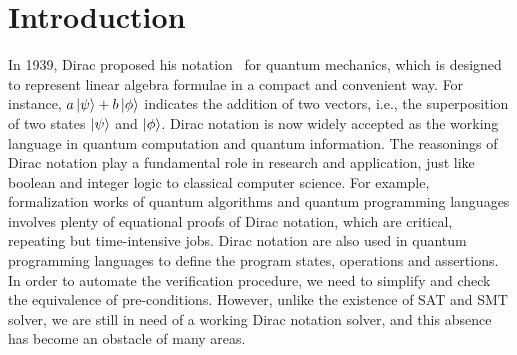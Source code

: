 \documentclass[runningheads]{llncs}
\begin{document}
\newcommand{\reduce}{\triangleright}

\newcommand{\Sort}{\mathsf{Sort}}
\newcommand{\WF}{\mathcal{WF}}

\newcommand{\Index}{\mathsf{Index}}
\newcommand{\Type}{\mathsf{Type}}
\newcommand{\Basis}{\mathsf{Basis}}

\newcommand{\SType}{\mathcal{S}}
\newcommand{\KType}{\mathcal{K}}
\newcommand{\BType}{\mathcal{B}}
\newcommand{\OType}{\mathcal{O}}
\newcommand{\SET}{\mathsf{Set}}

\newcommand{\ZEROK}{\mathbf{0}_\mathcal{K}}
\newcommand{\ZEROB}{\mathbf{0}_\mathcal{B}}
\newcommand{\ZEROO}{\mathbf{0}_\mathcal{O}}

\newcommand{\PAIR}{\mathsf{PAIR}}

\newcommand{\ZERO}{\mathsf{0}}
\newcommand{\ONE}{\mathsf{1}}
\newcommand{\ADDS}{\mathsf{ADDS}}
\newcommand{\ADD}{\mathsf{ADD}}
\newcommand{\MULS}{\mathsf{MULS}}
\newcommand{\MUL}{\mathsf{MUL}}
\newcommand{\CONJ}{\mathsf{CONJ}}
\newcommand{\CJG}{\mathsf{CJG}}
\newcommand{\ADJ}{\mathsf{ADJ}}
\newcommand{\DELTA}{\mathsf{DELTA}}
\newcommand{\DOT}{\mathsf{DOT}}
\newcommand{\SCR}{\mathsf{SCR}}
\newcommand{\TSR}{\mathsf{TSR}}
\newcommand{\KET}{\mathsf{KET}}
\newcommand{\BRA}{\mathsf{BRA}}
\newcommand{\ONEO}{\mathbf{1}_\mathcal{O}}
\newcommand{\OUTER}{\mathsf{OUTER}}
\newcommand{\MULK}{\mathsf{MULK}}
\newcommand{\MULB}{\mathsf{MULB}}
\newcommand{\MULO}{\mathsf{MULO}}


\section{Introduction}

In 1939, Dirac proposed his notation~\cite{dirac1939new} for quantum mechanics, which is designed to represent linear algebra formulae in a compact and convenient way.
For instance, $a\ket{\psi} + b\ket{\phi}$ indicates the addition of two vectors, i.e., the superposition of two states $\ket{\psi}$ and $\ket{\phi}$.
Dirac notation is now widely accepted as the working language in quantum computation and quantum information. The reasonings of Dirac notation play a fundamental role in research and application, just like boolean and integer logic to classical computer science. 
For example, formalization works of quantum algorithms and quantum programming languages involves plenty of equational proofs of Dirac notation, which are critical, repeating but time-intensive jobs.
Dirac notation are also used in quantum programming languages to define the program states, operations and assertions. In order to automate the verification procedure, we need to simplify and check the equivalence of pre-conditions. 
However, unlike the existence of SAT and SMT solver, we are still in need of a working Dirac notation solver, and this absence has become an obstacle of many areas.
\end{document}
